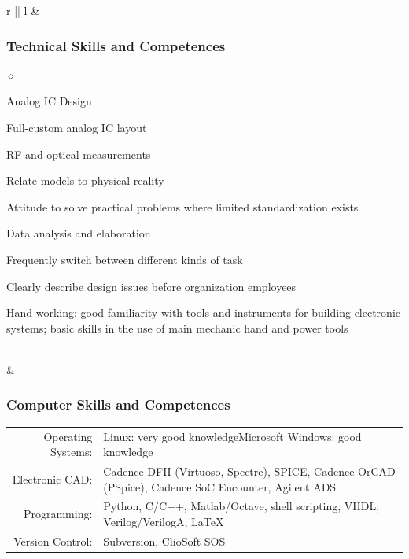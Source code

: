 \documentclass[a4paper]{article}
\newlength{\sectsep}
\newlength{\subsectsep}
\renewenvironment{itemize}{
  \begin{list}{$\diamond$}{
    \setlength{\topsep}{0.25em}
    \setlength{\itemsep}{0em}
    \setlength{\parskip}{0pt}
    \setlength{\parsep}{0em}
  }
}{
  \end{list}
}
\begin{document}
\begin{longtable}{r || l}
  & \begin{minipage}{0.9\textwidth}
      \vspace{\subsectsep}
      \subsubsection*{Technical Skills and Competences}
      \begin{itemize}
          \item Analog IC Design
          \item Full-custom analog IC layout
          \item RF and optical measurements
          \item Relate models to physical reality
          \item Attitude to solve practical problems where limited standardization exists
          \item Data analysis and elaboration
          \item Frequently switch between different kinds of task
          \item Clearly describe design issues before organization employees
          \item Hand-working: good familiarity with tools and instruments for building electronic systems; basic skills in the use of main mechanic hand and power tools
      \end{itemize}
  \end{minipage} \\[\sectsep]

  & \begin{minipage}{0.9\textwidth}
      \vspace{\subsectsep}
      \subsubsection*{Computer Skills and Competences}
      \begin{tabular*}{\textwidth}{r p{}}
        Operating Systems:&{Linux: very good knowledge\newline Microsoft Windows: good knowledge}\\[0.5ex]
        Electronic CAD:&Cadence DFII (Virtuoso, Spectre), SPICE, Cadence OrCAD (PSpice), Cadence SoC Encounter, Agilent ADS\\[0.5ex]
        Programming:&Python, C/C++, Matlab/Octave, shell scripting, VHDL, Verilog/VerilogA, {\fontfamily{cmr}\selectfont\LaTeX}\\[0.5ex]
        Version Control:&Subversion, ClioSoft SOS
      \end{tabular*}\\
  \end{minipage} \\[\sectsep]


\end{longtable}
\end{document}
